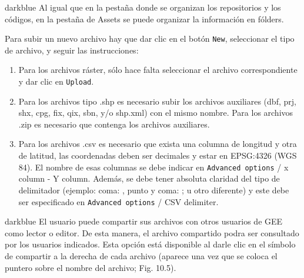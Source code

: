 \documentclass[
  12pt,
  letterpaper,
  twoside]{book}
\providecommand{\tightlist}{%
  \setlength{\itemsep}{0pt}\setlength{\parskip}{0pt}}
\begin{document}
\begin{bluebox2}

\begin{awesomeblock}{5pt}{\faLightbulb}{darkblue}
Al igual que en la pestaña donde se organizan los repositorios y los códigos, en la pestaña de Assets se puede organizar la información en fólders.

\end{awesomeblock}

\end{bluebox2}

Para subir un nuevo archivo hay que dar clic en el botón \texttt{New}, seleccionar el tipo de archivo, y seguir las instrucciones:

\begin{enumerate}
\def\labelenumi{\arabic{enumi}.}
\tightlist
\item
  Para los archivos ráster, sólo hace falta seleccionar el archivo correspondiente y dar clic en \texttt{Upload}.
\item
  Para los archivos tipo .shp es necesario subir los archivos auxiliares (dbf, prj, shx, cpg, fix, qix, sbn, y/o shp.xml) con el mismo nombre. Para los archivos .zip es necesario que contenga los archivos auxiliares.
\item
  Para los archivos .csv es necesario que exista una columna de longitud y otra de latitud, las coordenadas deben ser decimales y estar en EPSG:4326 (WGS 84). El nombre de esas columnas se debe indicar en \texttt{Advanced\ options} / x column - Y column. Además, se debe tener absoluta claridad del tipo de delimitador (ejemplo: coma: , punto y coma: ; u otro diferente) y este debe ser especificado en \texttt{Advanced\ options} / CSV delimiter.
\end{enumerate}

\begin{bluebox2}

\begin{awesomeblock}{5pt}{\faLightbulb}{darkblue}
El usuario puede compartir sus archivos con otros usuarios de GEE como lector o editor. De esta manera, el archivo compartido podra ser consultado por los usuarios indicados. Esta opción está disponible al darle clic en el símbolo de compartir a la derecha de cada archivo (aparece una vez que se coloca el puntero sobre el nombre del archivo; Fig. 10.5).

\end{awesomeblock}

\end{bluebox2}
\end{document}
